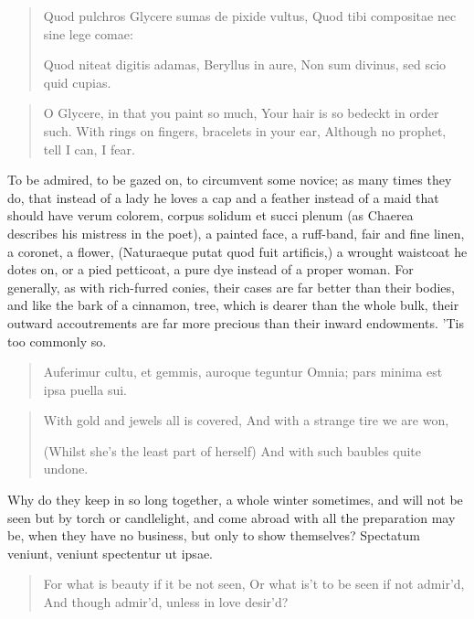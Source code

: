 \begin{latin}
\begin{verse}%
Quod pulchros Glycere sumas de pixide vultus,
Quod tibi compositae nec sine lege comae:

Quod niteat digitis adamas, Beryllus in aure,
Non sum divinus, sed scio quid cupias.
\end{verse}%
\end{latin}
\translationrule%
\begin{verse}%
O Glycere, in that you paint so much,
Your hair is so bedeckt in order such.
With rings on fingers, bracelets in your ear,
Although no prophet, tell I can, I fear.
\end{verse}%

To be admired, to be gazed on, to circumvent some novice; as many times
they do, that instead of a lady he loves a cap and a feather instead of
a maid that should have verum colorem, corpus solidum et succi plenum
(as Chaerea describes his mistress in the poet), a painted face,
a ruff-band, fair and fine linen, a coronet, a flower,
(Naturaeque putat quod fuit artificis,) a wrought waistcoat he
dotes on, or a pied petticoat, a pure dye instead of a proper woman.
For generally, as with rich-furred conies, their cases are far better
than their bodies, and like the bark of a cinnamon, tree, which is
dearer than the whole bulk, their outward accoutrements are far more
precious than their inward endowments. 'Tis too commonly so.

\begin{latin}
\begin{verse}%
Auferimur cultu, et gemmis, auroque teguntur
Omnia; pars minima est ipsa puella sui.
\end{verse}%
\end{latin}
\translationrule%
\begin{verse}%
With gold and jewels all is covered,
And with a strange tire we are won,

(Whilst she's the least part of herself)
And with such baubles quite undone.
\end{verse}%

Why do they keep in so long together, a whole winter sometimes, and
will not be seen but by torch or candlelight, and come abroad with all
the preparation may be, when they have no business, but only to show
themselves? Spectatum veniunt, veniunt spectentur ut ipsae.

\begin{verse}%
For what is beauty if it be not seen,
Or what is't to be seen if not admir'd,
And though admir'd, unless in love desir'd?
\end{verse}%

